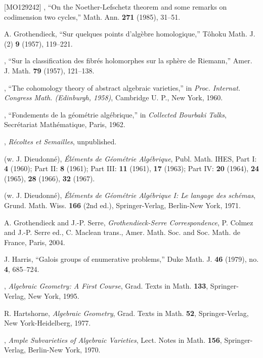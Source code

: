 \begin{thebibliography}{[MO129242]}
\sameauthor, ``On the Noether-Lefschetz theorem and some remarks on
codimension two cycles,'' Math. Ann. \textbf{271} (1985), 31--51.

A. Grothendieck, ``Sur quelques points d'algèbre homologique,'' Tôhoku Math.
J. (2) \textbf{9} (1957), 119--221.

\sameauthor, ``Sur la classification des fibrés holomorphes sur la sphère de
Riemann,'' Amer. J. Math. \textbf{79} (1957), 121--138.

\sameauthor, ``The cohomology theory of abstract algebraic varieties,'' in
\emph{Proc. Internat. Congress Math. (Edinburgh, 1958)}, Cambridge U. P., New
York, 1960.

\sameauthor, ``Fondements de la géométrie algébrique,'' in \emph{Collected
Bourbaki Talks}, Secrétariat Mathématique, Paris, 1962.

\sameauthor, \emph{Récoltes et Semailles}, unpublished.

\sameauthor{} (w. J. Dieudonné), \emph{Éléments de Géométrie Algébrique},
Publ. Math. IHES, Part I: \textbf{4} (1960); Part II: \textbf{8} (1961);
Part III: \textbf{11} (1961), \textbf{17} (1963); Part IV: \textbf{20} (1964),
\textbf{24} (1965), \textbf{28} (1966), \textbf{32} (1967).

\sameauthor{} (w. J. Dieudonné), \emph{Éléments de Géométrie Algébrique I: Le
langage des schémas}, Grund. Math. Wiss. \textbf{166} (2nd ed.),
Springer-Verlag, Berlin-New York, 1971.

A. Grothendieck and J.-P. Serre, \emph{Grothendieck-Serre Correspondence},
P. Colmez and J.-P. Serre ed., C. Maclean trans., Amer. Math. Soc. and Soc.
Math. de France, Paris, 2004.

J. Harris, ``Galois groups of enumerative problems,'' Duke Math. J.
\textbf{46} (1979), no. \textbf{4}, 685--724.

\sameauthor, \emph{Algebraic Geometry: A First Course}, Grad. Texts in Math.
\textbf{133}, Springer-Verlag, New York, 1995.

R. Hartshorne, \emph{Algebraic Geometry}, Grad. Texts in Math. \textbf{52},
Springer-Verlag, New York-Heidelberg, 1977.

\sameauthor, \emph{Ample Subvarieties of Algebraic Varieties}, Lect. Notes in
Math. \textbf{156}, Springer-Verlag, Berlin-New York, 1970.


\end{thebibliography}
